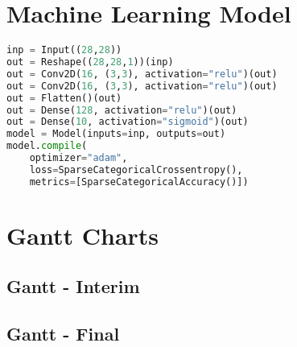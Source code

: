 \appendix

\chapter{Machine Learning Model} \label{ap:model}
\begin{lstlisting}[language=Python]
inp = Input((28,28))
out = Reshape((28,28,1))(inp)
out = Conv2D(16, (3,3), activation="relu")(out)
out = Conv2D(16, (3,3), activation="relu")(out)
out = Flatten()(out)
out = Dense(128, activation="relu")(out)
out = Dense(10, activation="sigmoid")(out)
model = Model(inputs=inp, outputs=out)
model.compile(
	optimizer="adam",
	loss=SparseCategoricalCrossentropy(),
	metrics=[SparseCategoricalAccuracy()])
\end{lstlisting}

\chapter{Gantt Charts}
\newpage
\section{Gantt - Interim} \label{gc-interim}
\begin{center}
\end{center}

\section{Gantt - Final} \label{gc-final}
\begin{center}
\end{center}